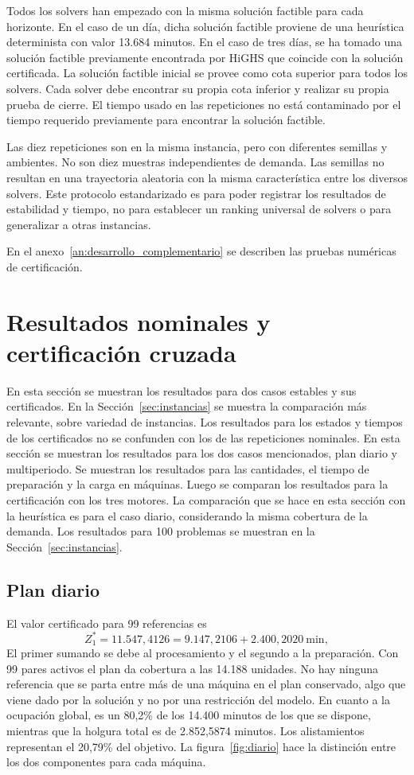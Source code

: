 \documentclass[12pt,a4paper,oneside]{article}
\begin{document}
Todos los solvers han empezado con la misma solución factible para cada horizonte. En el caso de un día, dicha solución factible proviene de una heurística determinista con valor 13.684 minutos. En el caso de tres días, se ha tomado una solución factible previamente encontrada por HiGHS que coincide con la solución certificada. La solución factible inicial se provee como cota superior para todos los solvers. Cada solver debe encontrar su propia cota inferior y realizar su propia prueba de cierre. El tiempo usado en las repeticiones no está contaminado por el tiempo requerido previamente para encontrar la solución factible.

Las diez repeticiones son en la misma instancia, pero con diferentes semillas y ambientes. No son diez muestras independientes de demanda. Las semillas no resultan en una trayectoria aleatoria con la misma característica entre los diversos solvers. Este protocolo estandarizado es para poder registrar los resultados de estabilidad y tiempo, no para establecer un ranking universal de solvers o para generalizar a otras instancias.

En el anexo~\ref{an:desarrollo_complementario} se describen las pruebas numéricas de certificación.

\section{Resultados nominales y certificación cruzada}\label{sec:resultados}
En esta sección se muestran los resultados para dos casos estables y sus certificados. En la Sección~\ref{sec:instancias} se muestra la comparación más relevante, sobre variedad de instancias. Los resultados para los estados y tiempos de los certificados no se confunden con los de las repeticiones nominales.
En esta sección se muestran los resultados para los dos casos mencionados, plan diario y multiperiodo. Se muestran los resultados para las cantidades, el tiempo de preparación y la carga en máquinas. Luego se comparan los resultados para la certificación con los tres motores. La comparación que se hace en esta sección con la heurística es para el caso diario, considerando la misma cobertura de la demanda. Los resultados para 100 problemas se muestran en la Sección~\ref{sec:instancias}.

\subsection{Plan diario}
El valor certificado para 99 referencias es
\begin{equation}
Z_1^*=11.547,4126=9.147,2106+2.400,2020\ \text{min},
\end{equation}
El primer sumando se debe al procesamiento y el segundo a la preparación. Con 99 pares activos el plan da cobertura a las 14.188 unidades. No hay ninguna referencia que se parta entre más de una máquina en el plan conservado, algo que viene dado por la solución y no por una restricción del modelo. En cuanto a la ocupación global, es un 80,2\% de los 14.400 minutos de los que se dispone, mientras que la holgura total es de 2.852,5874 minutos. Los alistamientos representan el 20,79\% del objetivo. La figura~\ref{fig:diario} hace la distinción entre los dos componentes para cada máquina.
\end{document}
